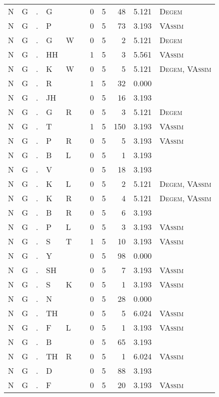 \begin{longtable}{r@{ } r@{ } c@{ } l@{ } l@{ } l@{ } r r r r l }
N & G & . & G &  &  & 0 & 5 & 48 & 5.121 & \textsc{Degem} \\
N & G & . & P &  &  & 0 & 5 & 73 & 3.193 & \textsc{VAssim} \\
N & G & . & G & W &  & 0 & 5 & 2 & 5.121 & \textsc{Degem} \\
N & G & . & HH &  &  & 1 & 5 & 3 & 5.561 & \textsc{VAssim} \\
N & G & . & K & W &  & 0 & 5 & 5 & 5.121 & \textsc{Degem}, \textsc{VAssim} \\
N & G & . & R &  &  & 1 & 5 & 32 & 0.000 &  \\
N & G & . & JH &  &  & 0 & 5 & 16 & 3.193 &  \\
N & G & . & G & R &  & 0 & 5 & 3 & 5.121 & \textsc{Degem} \\
N & G & . & T &  &  & 1 & 5 & 150 & 3.193 & \textsc{VAssim} \\
N & G & . & P & R &  & 0 & 5 & 5 & 3.193 & \textsc{VAssim} \\
N & G & . & B & L &  & 0 & 5 & 1 & 3.193 &  \\
N & G & . & V &  &  & 0 & 5 & 18 & 3.193 &  \\
N & G & . & K & L &  & 0 & 5 & 2 & 5.121 & \textsc{Degem}, \textsc{VAssim} \\
N & G & . & K & R &  & 0 & 5 & 4 & 5.121 & \textsc{Degem}, \textsc{VAssim} \\
N & G & . & B & R &  & 0 & 5 & 6 & 3.193 &  \\
N & G & . & P & L &  & 0 & 5 & 3 & 3.193 & \textsc{VAssim} \\
N & G & . & S & T &  & 1 & 5 & 10 & 3.193 & \textsc{VAssim} \\
N & G & . & Y &  &  & 0 & 5 & 98 & 0.000 &  \\
N & G & . & SH &  &  & 0 & 5 & 7 & 3.193 & \textsc{VAssim} \\
N & G & . & S & K &  & 0 & 5 & 1 & 3.193 & \textsc{VAssim} \\
N & G & . & N &  &  & 0 & 5 & 28 & 0.000 &  \\
N & G & . & TH &  &  & 0 & 5 & 5 & 6.024 & \textsc{VAssim} \\
N & G & . & F & L &  & 0 & 5 & 1 & 3.193 & \textsc{VAssim} \\
N & G & . & B &  &  & 0 & 5 & 65 & 3.193 &  \\
N & G & . & TH & R &  & 0 & 5 & 1 & 6.024 & \textsc{VAssim} \\
N & G & . & D &  &  & 0 & 5 & 88 & 3.193 &  \\
N & G & . & F &  &  & 0 & 5 & 20 & 3.193 & \textsc{VAssim} \\

\end{longtable}
